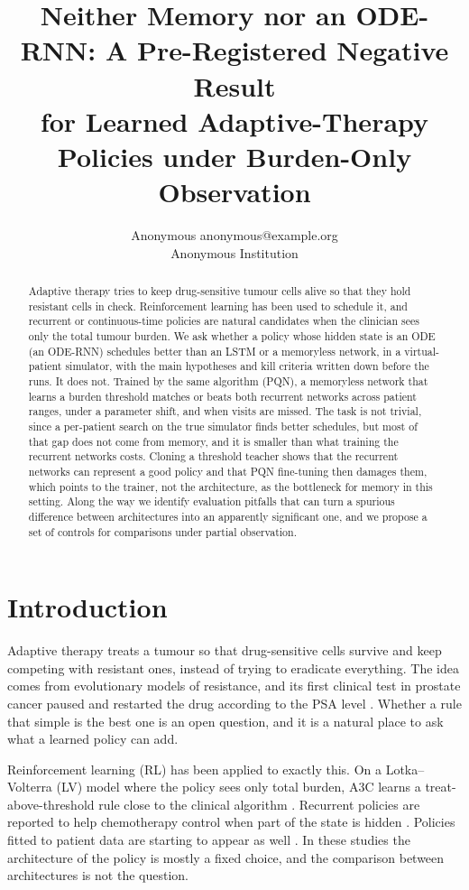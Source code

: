 \documentclass[10pt]{article}
\title{Neither Memory nor an ODE-RNN: A Pre-Registered Negative Result\\
for Learned Adaptive-Therapy Policies under Burden-Only Observation}
\author{\name Anonymous \email anonymous@example.org \\ \addr Anonymous Institution}
\renewcommand{\cite}{\citep}
\begin{document}
\maketitle

\begin{abstract}
Adaptive therapy tries to keep drug-sensitive tumour cells alive so that they
hold resistant cells in check. Reinforcement learning has been used to schedule
it, and recurrent or continuous-time policies are natural candidates when the
clinician sees only the total tumour burden. We ask whether a policy whose
hidden state is an ODE (an ODE-RNN) schedules better than an LSTM or a
memoryless network, in a virtual-patient simulator, with the main hypotheses and
kill criteria written down before the runs. It does not. Trained by the same
algorithm (PQN), a memoryless network that learns a burden threshold matches or
beats both recurrent networks across patient ranges, under a parameter shift,
and when visits are missed. The task is not trivial, since a per-patient search
on the true simulator finds better schedules, but most of that gap does not
come from memory, and it is smaller than what training the recurrent networks
costs. Cloning a threshold teacher shows that the recurrent networks can
represent a good policy and that PQN fine-tuning then damages them, which
points to the trainer, not the architecture, as the bottleneck for memory in
this setting.
Along the way we identify evaluation pitfalls that can turn a spurious
difference between architectures into an apparently significant one, and we
propose a set of controls for comparisons under partial observation.
\end{abstract}

\section{Introduction}
Adaptive therapy treats a tumour so that drug-sensitive cells survive and keep
competing with resistant ones, instead of trying to eradicate everything. The
idea comes from evolutionary models of resistance, and its first clinical test
in prostate cancer paused and restarted the drug according to the PSA level
\cite{zhang2017}. Whether a rule that simple is the best one is an open
question, and it is a natural place to ask what a learned policy can add.

Reinforcement learning (RL) has been applied to exactly this. On a
Lotka--Volterra (LV) model where the policy sees only total burden, A3C learns a
treat-above-threshold rule close to the clinical algorithm \cite{gallagher2024}.
Recurrent policies are reported to help chemotherapy control when part of the
state is hidden \cite{kiram2026}. Policies fitted to patient data are starting
to appear as well \cite{lu2024}. In these studies the architecture of the policy
is mostly a fixed choice, and the comparison between architectures is not the
question.
\end{document}
